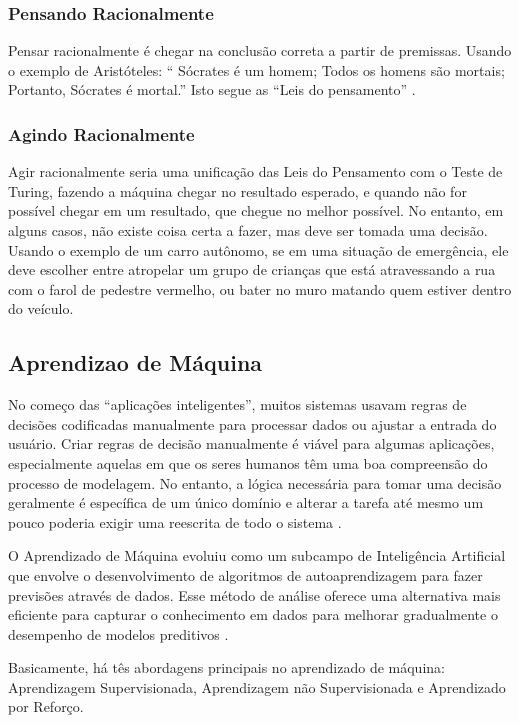 \documentclass[
	12pt,				%
	openright,			%
	oneside,			%
	a4paper,			%
	english,			%
	spanish,			%
	brazil				%
	]{abntex2}
\begin{document}
	\subsubsection*{Pensando Racionalmente}
		Pensar racionalmente é chegar na conclusão correta a partir de premissas. Usando o exemplo de Aristóteles: ``
Sócrates é um homem; Todos os homens são mortais; Portanto, Sócrates é mortal.''  Isto segue as ``Leis do pensamento''  \cite{laws_of_thought}.
		
	\subsubsection*{Agindo Racionalmente}
		Agir racionalmente seria uma unificação das Leis do Pensamento com o Teste de Turing, fazendo a máquina chegar no resultado esperado, e quando não for possível chegar em um resultado, que chegue no melhor possível. No entanto, em alguns casos, não existe coisa certa a fazer, mas deve ser tomada uma decisão. Usando o exemplo de um carro autônomo, se em uma situação de emergência, ele deve escolher entre atropelar um grupo de crianças que está atravessando a rua com o farol de pedestre vermelho, ou bater no muro matando quem estiver dentro do veículo.
	
	\subsection{Aprendizao de Máquina}
		No começo das ``aplicações inteligentes'', muitos sistemas usavam regras de decisões codificadas manualmente para processar dados ou ajustar a entrada do usuário. Criar regras de decisão manualmente é viável para algumas aplicações, especialmente aquelas em que os seres humanos têm uma boa compreensão do processo de modelagem. No entanto, a lógica necessária para tomar uma decisão geralmente é específica de um único domínio e alterar a tarefa até mesmo um pouco poderia exigir uma reescrita de todo o sistema \cite {guido_muller}.

		O Aprendizado de Máquina evoluiu como um subcampo de Inteligência Artificial que envolve o desenvolvimento de algoritmos de autoaprendizagem para fazer previsões através de dados. Esse método de análise oferece uma alternativa mais eficiente para capturar o conhecimento em dados para melhorar gradualmente o desempenho de modelos preditivos \cite{ r_julian_heart}.

		Basicamente, há tês abordagens principais no aprendizado de máquina: Aprendizagem Supervisionada, Aprendizagem não Supervisionada e Aprendizado por Reforço.
\end{document}
